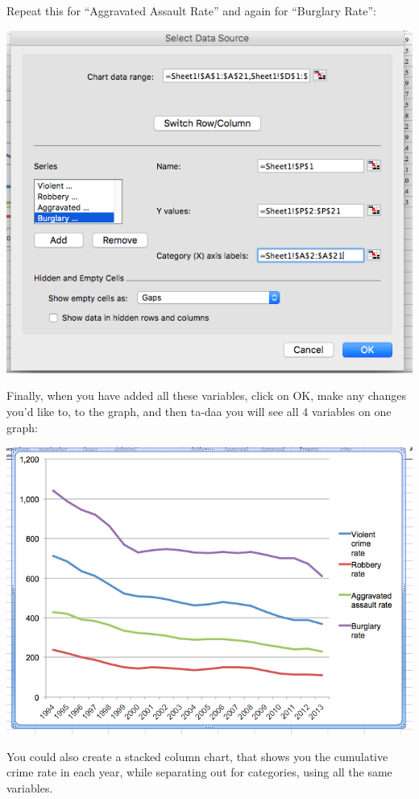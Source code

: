 \documentclass[
]{book}
\begin{document}
Repeat this for ``Aggravated Assault Rate'' and again for ``Burglary Rate'':

\includegraphics{imgs/comp_c_5.png}

Finally, when you have added all these variables, click on OK, make any changes you'd like to, to the graph, and then ta-daa you will see all 4 variables on one graph:

\includegraphics{imgs/comp_c_6.png}

You could also create a stacked column chart, that shows you the cumulative crime rate in each year, while separating out for categories, using all the same variables.
\end{document}
